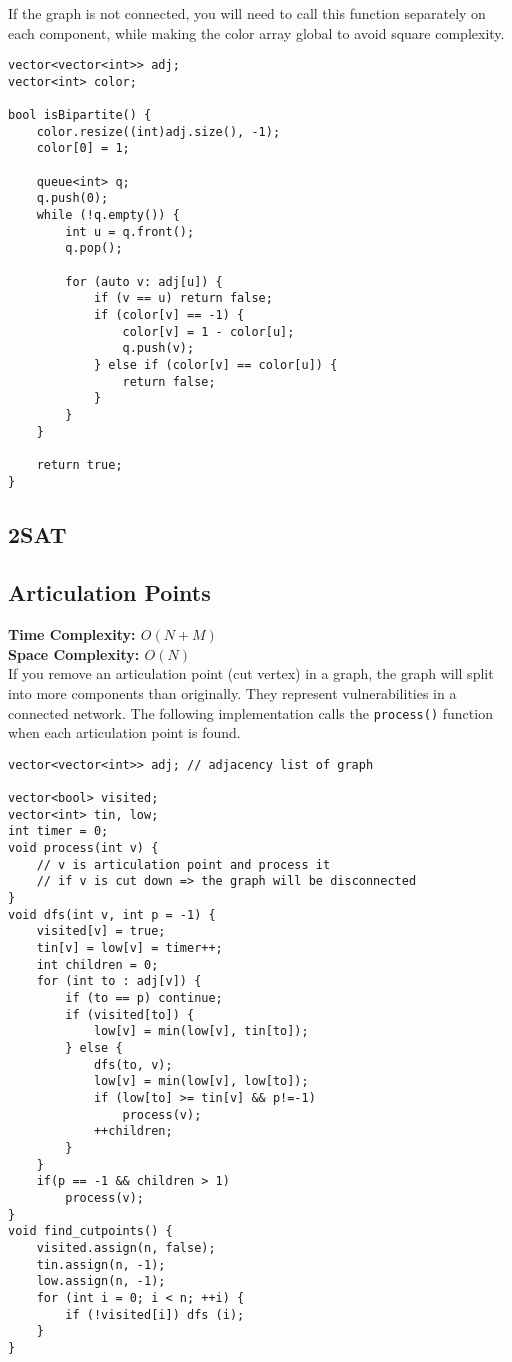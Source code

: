 \begin{remark}
  If the graph is not connected, you will need to call this function
separately on each component, while making the color array global
to avoid square complexity.
\end{remark}

\begin{lstlisting}
vector<vector<int>> adj;
vector<int> color;

bool isBipartite() {
    color.resize((int)adj.size(), -1);
    color[0] = 1;
 
    queue<int> q;
    q.push(0);
    while (!q.empty()) {
        int u = q.front();
        q.pop();
 
        for (auto v: adj[u]) {
            if (v == u) return false;
            if (color[v] == -1) {
                color[v] = 1 - color[u];
                q.push(v);
            } else if (color[v] == color[u]) {
                return false;
            }
        }
    }
 
    return true;
}
\end{lstlisting}

\newpage
\subsection{2SAT}

\subsection{Articulation Points}

\textbf{Time Complexity: $O(N + M)$}\\
\textbf{Space Complexity: $O(N)$}\\

If you remove an articulation point (cut vertex) in a graph,
the graph will split into more components than originally.
They represent vulnerabilities in a connected network.
The following implementation \cite{CutPointsCPAlgo}
calls the \lstinline{process()} function when each articulation
point is found. 

\begin{lstlisting}
vector<vector<int>> adj; // adjacency list of graph

vector<bool> visited;
vector<int> tin, low;
int timer = 0;
void process(int v) {
    // v is articulation point and process it
    // if v is cut down => the graph will be disconnected
}
void dfs(int v, int p = -1) {
    visited[v] = true;
    tin[v] = low[v] = timer++;
    int children = 0;
    for (int to : adj[v]) {
        if (to == p) continue;
        if (visited[to]) {
            low[v] = min(low[v], tin[to]);
        } else {
            dfs(to, v);
            low[v] = min(low[v], low[to]);
            if (low[to] >= tin[v] && p!=-1)
                process(v);
            ++children;
        }
    }
    if(p == -1 && children > 1)
        process(v);
}
void find_cutpoints() {
    visited.assign(n, false);
    tin.assign(n, -1);
    low.assign(n, -1);
    for (int i = 0; i < n; ++i) {
        if (!visited[i]) dfs (i);
    }
}
\end{lstlisting}

